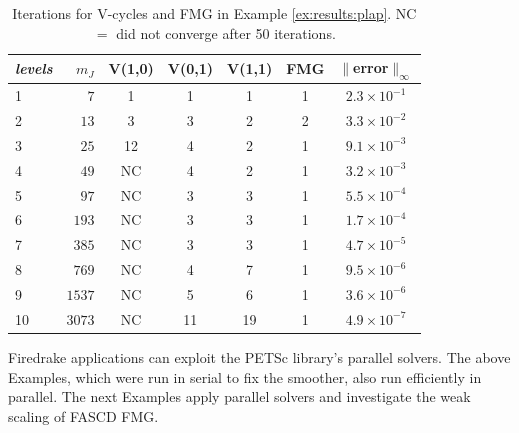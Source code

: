 \documentclass[review,hidelinks,onefignum,onetabnum]{siamart220329}
\begin{document}
\begin{table}[ht]
\centering
\begin{tabular}{lr@{\hskip 7mm}c@{\hskip 3mm}c@{\hskip 3mm}c@{\hskip 4mm}c@{\hskip 6mm}c}
\toprule
\emph{levels} & $m_J$ & V(1,0) & V(0,1) & V(1,1) & FMG & $\|$error$\|_\infty$ \\
\midrule
 1 &    $7$ &  1 &  1 &  1 &  1 & $2.3\times 10^{-1}$ \\
 2 &   $13$ &  3 &  3 &  2 &  2 & $3.3 \times 10^{-2}$ \\
 3 &   $25$ & 12 &  4 &  2 &  1 & $9.1 \times 10^{-3}$ \\
 4 &   $49$ & NC &  4 &  2 &  1 & $3.2 \times 10^{-3}$ \\
 5 &   $97$ & NC &  3 &  3 &  1 & $5.5 \times 10^{-4}$ \\
 6 &  $193$ & NC &  3 &  3 &  1 & $1.7 \times 10^{-4}$ \\
 7 &  $385$ & NC &  3 &  3 &  1 & $4.7 \times 10^{-5}$ \\
 8 &  $769$ & NC &  4 &  7 &  1 & $9.5 \times 10^{-6}$ \\
 9 & $1537$ & NC &  5 &  6 &  1 & $3.6 \times 10^{-6}$ \\
10 & $3073$ & NC & 11 & 19 &  1 & $4.9 \times 10^{-7}$ \\
\bottomrule
\end{tabular}
\bigskip
\caption{Iterations for V-cycles and FMG in Example \ref{ex:results:plap}.  NC $=$ did not converge after 50 iterations.}
\label{tab:results:fastplap1d}
\end{table}

Firedrake applications can exploit the PETSc \cite{Balayetal2023} library's parallel solvers.  The above Examples, which were run in serial to fix the smoother, also run efficiently in parallel.  The next Examples apply parallel solvers and investigate the weak scaling of FASCD FMG.
\end{document}
